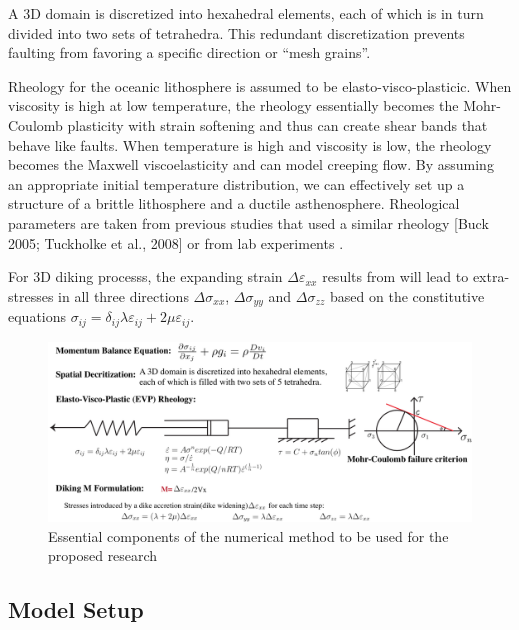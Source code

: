 \documentclass[12pt]{article}
\begin{document}
A 3D domain is discretized into hexahedral elements, each of which is in turn divided into two sets of tetrahedra. This redundant discretization prevents faulting from favoring a specific direction or ``mesh grains''. 

Rheology for the oceanic lithosphere is assumed to be elasto-visco-plasticic. When viscosity is high at low temperature, the rheology essentially becomes the Mohr-Coulomb plasticity with strain softening and thus can create shear bands that behave like faults. When temperature is high and viscosity is low, the rheology becomes the Maxwell viscoelasticity and can model creeping flow. By assuming an appropriate initial temperature distribution, we can effectively set up a structure of a brittle lithosphere and a ductile asthenosphere. Rheological parameters are taken from previous studies that used a similar rheology [Buck 2005; Tuckholke et al., 2008] or from lab experiments \citep[e.g.,][]{Kirby1987}. 

For 3D diking processs, the expanding strain $\Delta\varepsilon_{xx}$ results from  will lead to extra-stresses in all three directions $\Delta\sigma_{xx}$, $\Delta\sigma_{yy}$ and $\Delta\sigma_{zz}$ based on the constitutive equations $\sigma_{ij}=\delta_{ij}\lambda\varepsilon_{ij}+2\mu\varepsilon_{ij}$.

\begin{figure}[H]
 \centering
  \includegraphics[scale=0.46]{fig7_1.png}
 \caption{\small{Essential components of the numerical method to be used for the proposed research}}
 \label{fig7_1}
\end{figure}

\subsection{Model Setup}
\end{document}
